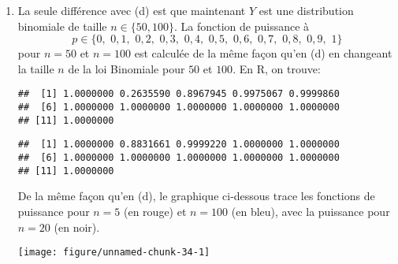 \begin{solution}{6.1}
\begin{enumerate}
\item La seule différence avec (d) est que maintenant $Y$ est une distribution binomiale de taille $n \in \{50,100\}$. La fonction de puissance à $$
p\in\{0,\,\, 0,1,\,\, 0,2,\,\, 0,3,\,\, 0,4,\,\, 0,5,\,\, 0,6,\,\, 0,7,\,\, 0,8,\,\, 0,9,\,\, 1\}
$$
pour $n=50$ et $n=100$ est calculée de la même façon qu'en (d) en changeant la taille $n$ de la loi Binomiale pour $50$ et $100$. En \textsf{R}, on trouve:
\begin{knitrout}
\color{fgcolor}\begin{kframe}
\begin{alltt}
 \hlkwb{<-} \hlstd{(}\hlstd{,}\hlstd{=}\hlstd{,} \hlopt{+} \hlopt{-}\hlstd{(}\hlstd{,}\hlstd{=}\hlstd{,}
\end{alltt}
\begin{verbatim}
##  [1] 1.0000000 0.2635590 0.8967945 0.9975067 0.9999860
##  [6] 1.0000000 1.0000000 1.0000000 1.0000000 1.0000000
## [11] 1.0000000
\end{verbatim}
\begin{alltt}
 \hlkwb{<-} \hlstd{(}\hlstd{,}\hlstd{=}\hlstd{,} \hlopt{+} \hlopt{-}\hlstd{(}\hlstd{,}\hlstd{=}\hlstd{,}
\end{alltt}
\begin{verbatim}
##  [1] 1.0000000 0.8831661 0.9999220 1.0000000 1.0000000
##  [6] 1.0000000 1.0000000 1.0000000 1.0000000 1.0000000
## [11] 1.0000000
\end{verbatim}
\end{kframe}
\end{knitrout}
De la même façon qu'en (d), le graphique ci-dessous trace les fonctions de puissance pour $n=5$ (en rouge) et $n=100$ (en bleu), avec la puissance pour $n=20$ (en noir).
\begin{knitrout}
\color{fgcolor}\begin{kframe}
\begin{alltt}
\hlstd{=}\hlstd{)}
\hlstd{=}\hlstd{,}\hlstd{=}\hlstd{)}
\hlstd{=}\hlstd{,}\hlstd{=}\hlstd{)}
\end{alltt}
\end{kframe}
\texttt{[image: figure/unnamed-chunk-34-1]}


\end{knitrout}
\end{enumerate}
\end{solution}
